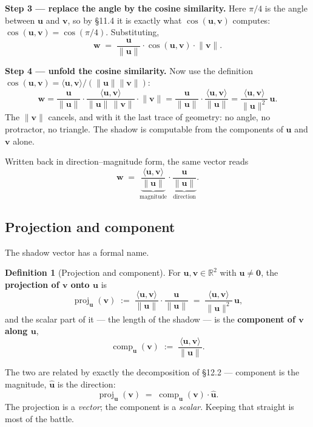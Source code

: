 \documentclass[11pt]{article}
\theoremstyle{definition}
\newtheorem{defn}{Definition}
\theoremstyle{remark}
\newcommand{\R}{\mathbb{R}}
\newcommand{\vc}[1]{\mathbf{#1}}
\newcommand{\norm}[1]{\lVert #1\rVert}
\newcommand{\uv}[1]{\hat{\vc{#1}}}                 %
\newcommand{\proj}[2]{\operatorname{proj}_{#1}(#2)}
\newcommand{\comp}[2]{\operatorname{comp}_{#1}(#2)}
\begin{document}
\smallskip
\noindent\textbf{Step 3 --- replace the angle by the cosine similarity.} Here
$\pi/4$ is the angle between $\vc{u}$ and $\vc{v}$, so by \S11.4 it is exactly
what $\cos(\vc{u},\vc{v})$ computes:
$\cos(\vc{u},\vc{v})=\cos(\pi/4)$. Substituting,
\[
  \vc{w} \;=\; \frac{\vc{u}}{\norm{\vc{u}}}\cdot\cos(\vc{u},\vc{v})\cdot\norm{\vc{v}} .
\]

\smallskip
\noindent\textbf{Step 4 --- unfold the cosine similarity.} Now use the
definition $\cos(\vc{u},\vc{v})=\langle\vc{u},\vc{v}\rangle/(\norm{\vc{u}}\norm{\vc{v}})$:
\[
  \vc{w}
  = \frac{\vc{u}}{\norm{\vc{u}}}
    \cdot\frac{\langle\vc{u},\vc{v}\rangle}{\norm{\vc{u}}\,\norm{\vc{v}}}
    \cdot\norm{\vc{v}}
  = \frac{\vc{u}}{\norm{\vc{u}}}\cdot\frac{\langle\vc{u},\vc{v}\rangle}{\norm{\vc{u}}}
  = \frac{\langle\vc{u},\vc{v}\rangle}{\norm{\vc{u}}^{2}}\,\vc{u} .
\]
The $\norm{\vc{v}}$ cancels, and with it the last trace of geometry: no angle,
no protractor, no triangle. The shadow is computable from the components of
$\vc{u}$ and $\vc{v}$ alone.

\smallskip
\noindent Written back in direction--magnitude form, the same vector reads
\[
  \vc{w}
  \;=\;
  \underbrace{\frac{\langle\vc{u},\vc{v}\rangle}{\norm{\vc{u}}}}_{\textstyle\text{magnitude}}
  \cdot
  \underbrace{\frac{\vc{u}}{\norm{\vc{u}}}}_{\textstyle\text{direction}} .
\]

\subsection{Projection and component}
The shadow vector has a formal name.

\begin{defn}[Projection and component]
For $\vc{u},\vc{v}\in\R^{2}$ with $\vc{u}\neq\vc{0}$, the \textbf{projection of
$\vc{v}$ onto $\vc{u}$} is
\[
  \proj{\vc{u}}{\vc{v}}
  \;:=\;
  \frac{\langle\vc{u},\vc{v}\rangle}{\norm{\vc{u}}}\cdot\frac{\vc{u}}{\norm{\vc{u}}}
  \;=\;
  \frac{\langle\vc{u},\vc{v}\rangle}{\norm{\vc{u}}^{2}}\,\vc{u} ,
\]
and the scalar part of it --- the length of the shadow --- is the
\textbf{component of $\vc{v}$ along $\vc{u}$},
\[
  \comp{\vc{u}}{\vc{v}} \;:=\; \frac{\langle\vc{u},\vc{v}\rangle}{\norm{\vc{u}}} .
\]
\end{defn}

\noindent The two are related by exactly the decomposition of \S12.2 ---
component is the magnitude, $\uv{u}$ is the direction:
\[
  \proj{\vc{u}}{\vc{v}} \;=\; \comp{\vc{u}}{\vc{v}}\cdot\uv{u} .
\]
The projection is a \emph{vector}; the component is a \emph{scalar}. Keeping
that straight is most of the battle.
\end{document}
